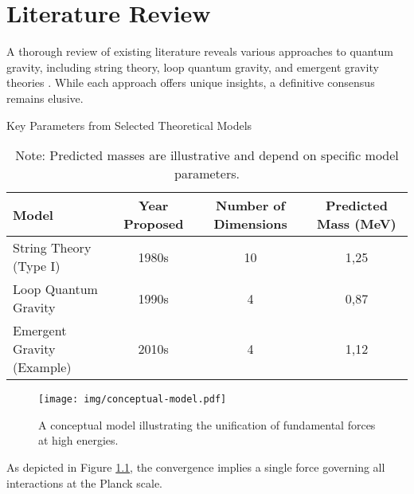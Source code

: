 \chapter{Literature Review}
\label{chap:literature_review}
A thorough review of existing literature reveals various approaches to quantum gravity, including string theory, loop quantum gravity, and emergent gravity theories \citep{Smith2023, Bloggs2021}. While each approach offers unique insights, a definitive consensus remains elusive.




\blindtext[1] %

\begin{table}[h!]
    \centering
    \caption{Key Parameters from Selected Theoretical Models}
    \label{tab:sample-data}
    \begin{tabular}{l c c S[table-format=2.2]}
        \toprule
        Model & Year Proposed & Number of Dimensions & {Predicted Mass (\si{\mega\electronvolt})} \\
        \midrule
        String Theory (Type I) & 1980s & 10 & 1,25 \\
        Loop Quantum Gravity & 1990s & 4 & 0,87 \\
        Emergent Gravity (Example) & 2010s & 4 & 1,12 \\
        \bottomrule
    \end{tabular}
    \caption*{Note: Predicted masses are illustrative and depend on specific model parameters.}
\end{table}

\begin{figure}[h!]
    \centering
    \texttt{[image: img/conceptual-model.pdf]}
    \caption{A conceptual model illustrating the unification of fundamental forces at high energies.}
    \label{fig:conceptual-model}
\end{figure}
As depicted in Figure \ref{fig:conceptual-model}, the convergence implies a single force governing all interactions at the Planck scale.

